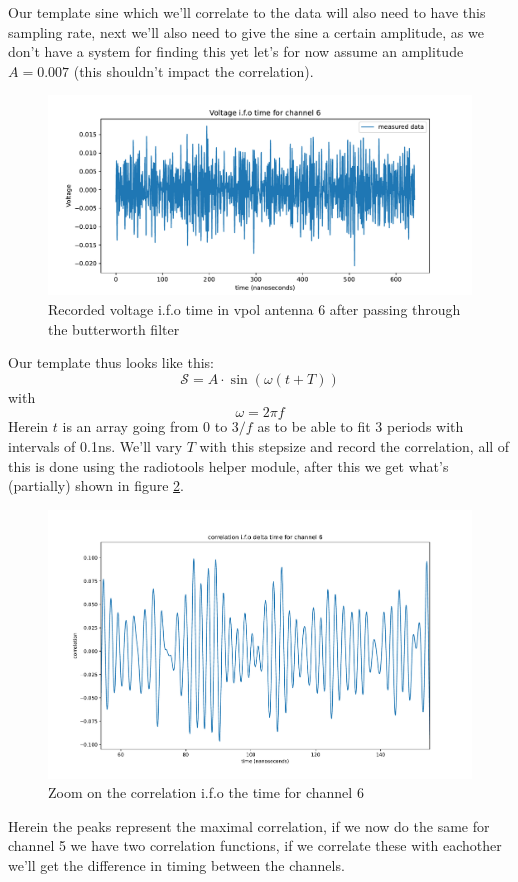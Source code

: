 \documentclass[11pt,a4paper,faculty=we,language=en,doctype=report]{cls/ugent-doc}
\begin{document}
Our template sine which we'll correlate to the data
will also need to have this sampling rate, next we'll also need to give the sine
a certain amplitude, as we don't have a system for finding this yet let's for now
assume an amplitude $A = 0.007$ (this shouldn't impact the correlation). 
\begin{figure}
	\centering
	\includegraphics[width=\textwidth]{figures/VoltageAfterFilter.pdf}
	\caption{Recorded voltage i.f.o time in vpol antenna 6 after passing through the butterworth filter}
	\label{fig:VoltageAfterFilter}
\end{figure}
Our template thus looks like this:
\begin{equation}
	\mathcal{S} = A\cdot\sin\left(\omega(t + T)\right) 
\end{equation}
with
\begin{equation}
	\omega = 2\pi f
\end{equation}
Herein $t$ is an array going from 0 to $3/f$ as to be able to fit 3 periods
with intervals of 0.1ns.  We'll vary $T$ with this stepsize and record the
correlation, all of this is done using the radiotools helper module, after this
we get what's (partially) shown in figure \ref{fig:CorrCh6}.
\begin{figure}
	\centering
	\includegraphics[width=\textwidth]{figures/CorrelationCh6.pdf}
	\caption{Zoom on the correlation i.f.o the time for channel 6}
	\label{fig:CorrCh6}
\end{figure}
Herein the peaks represent the maximal correlation, if we now do the same for channel
5 we have two correlation functions, if we correlate these with eachother we'll get the
difference in timing between the channels.
\end{document}
